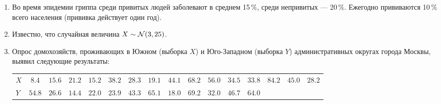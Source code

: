 \begin{enumerate}
\item Во время эпидемии гриппа среди привитых людей заболевают в среднем 15\,\%, среди непривитых — 20\,\%. Ежегодно прививаются 10\,\% всего населения (прививка действует один год).

\item Известно, что случайная величина $X\sim\mathcal{N}(3,25)$.

\item Опрос домохозяйств, проживающих в Южном (выборка $X$) и Юго-Западном (выборка $Y$)
административных округах города Москвы, выявил следующие результаты:

\begin{tabular}{@{}lccccccccccccccc@{}}
\toprule
$X$  & $8.4$ & $15.6$ & $21.2$ & $15.2$ & $38.2$ & $28.3$ & $19.1$ & $44.1$ & $68.2$ & $56.0$ & $34.5$ & $33.8$ & $84.2$ & $45.0$ & $28.2$  \\
$Y$ & $54.8$ & $26.6$ & $14.4$ & $22.0$ & $23.9$ & $43.3$ & $65.1$ & $18.0$ & $69.2$ & $32.0$ & $46.7$ & $64.0$  \\ \bottomrule
\end{tabular}


\end{enumerate}
